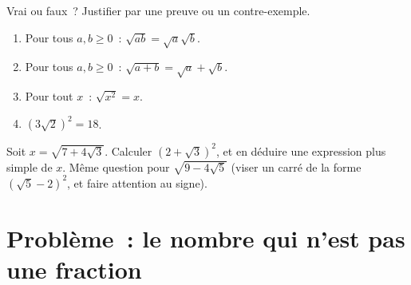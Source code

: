 \begin{exercise}[$\star\star$]\label{exo:g9:sqrt:9}
Vrai ou faux~? Justifier par une preuve ou un contre-exemple.
\begin{enumerate}
  \item Pour tous $a, b \geq 0$~: $\sqrt{ab} = \sqrt a \sqrt b$.
  \item Pour tous $a, b \geq 0$~: $\sqrt{a+b} = \sqrt a + \sqrt b$.
  \item Pour tout $x$~: $\sqrt{x^2} = x$.
  \item $\left(3\sqrt2\right)^2 = 18$.
\end{enumerate}
\end{exercise}

\begin{exercise}[$\star\star\star$]\label{exo:g9:sqrt:10}
Soit $x = \sqrt{7 + 4\sqrt3}$. Calculer
$\left(2 + \sqrt3\right)^2$, et en déduire une expression plus simple
de $x$. Même question pour $\sqrt{9 - 4\sqrt5}$ (viser un carré de la
forme $\left(\sqrt5 - 2\right)^2$, et faire attention au signe).
\end{exercise}

\section{Problème~: le nombre qui n'est pas une fraction}

